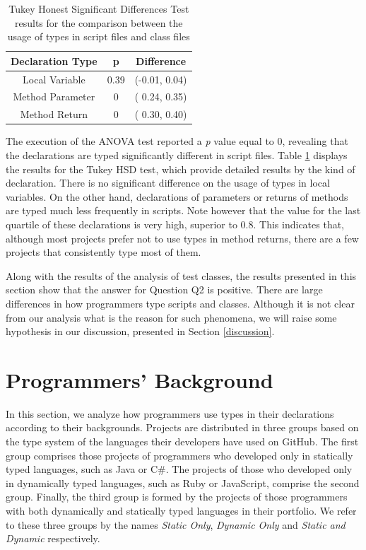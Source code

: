 \documentclass[msc]{ppgccufmg}
\begin{document}
\begin{table}[ht]
\centering{}%

\begin{tabular}{|c|c|c|}
\hline 
Declaration Type & p & Difference \\
\hline 
\hline 
Local Variable   & 0.39 & (-0.01, 0.04) \\ \hline
Method Parameter & 0    & ( 0.24, 0.35) \\ \hline
Method Return    & 0    & ( 0.30, 0.40) \\ \hline
\end{tabular}
\caption{Tukey Honest Significant Differences Test results for the comparison between the usage of types in script files and class files}
\label{tab:script_utest_all}
\end{table}

The execution of the ANOVA test reported a \emph{p} value equal to 0, revealing that the declarations are typed significantly different in script files.
Table \ref{tab:script_utest_all} displays the results for the Tukey HSD test, which provide detailed results by the kind of declaration.
There is no significant difference on the usage of types in local variables.
On the other hand, declarations of parameters or returns of methods are typed much less frequently in scripts.
Note however that the value for the last quartile of these declarations is very high, superior to 0.8.
This indicates that, although most projects prefer not to use types in method returns, there are a few projects that consistently type most of them.

Along with the results of the analysis of test classes, the results presented in this section show that the answer for Question Q2 is positive.
There are large differences in how programmers type scripts and classes.
Although it is not clear from our analysis what is the reason for such phenomena, we will raise some hypothesis in our discussion, presented in Section \ref{discussion}.




\section{Programmers' Background\label{sec:results-background}}
In this section, we analyze how programmers use types in their declarations according to their backgrounds.
Projects are distributed in three groups based on the type system of the languages their developers have used on GitHub.
The first group comprises those projects of programmers who developed only in statically typed languages, such as Java or C\#.
The projects of those who developed only in dynamically typed languages, such as Ruby or JavaScript, comprise the second group.
Finally, the third group is formed by the projects of those programmers with both dynamically and statically typed languages in their portfolio.
We refer to these three groups by the names \emph{Static Only}, \emph{Dynamic Only} and \emph{Static and Dynamic} respectively.
\end{document}
